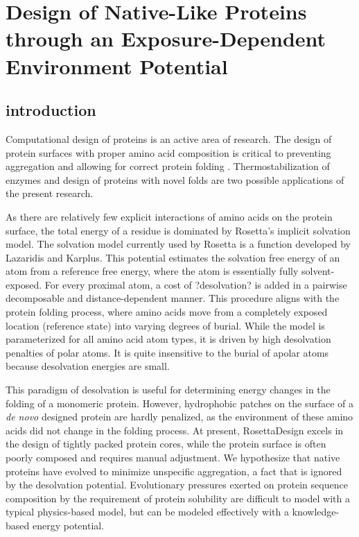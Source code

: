 \chapter{Design of Native-Like Proteins through an Exposure-Dependent Environment Potential}

\section{introduction}
Computational design of proteins is an active area of research.
The design of protein surfaces with proper amino acid composition is critical to preventing aggregation and allowing for correct protein folding \citep{Chandler:2005ds}.
Thermostabilization of enzymes and design of proteins with novel folds are two possible applications of the present research. 

As there are relatively few explicit interactions of amino acids on the protein surface, the total energy of a residue is dominated by Rosetta's implicit solvation model.
The solvation model currently used by Rosetta is a function developed by Lazaridis and Karplus\citep{Lazaridis:1999wi}.
This potential estimates the solvation free energy of an atom from a reference free energy, where the atom is essentially fully solvent-exposed.
For every proximal atom, a cost of ?desolvation? is added in a pairwise decomposable and distance-dependent manner.
This procedure aligns with the protein folding process, where amino acids move from a completely exposed location (reference state) into varying degrees of burial.
While the model is parameterized for all amino acid atom types, it is driven by high desolvation penalties of polar atoms.
It is quite insensitive to the burial of apolar atoms because desolvation energies are small. 

This paradigm of desolvation is useful for determining energy changes in the folding of a monomeric protein.
However, hydrophobic patches on the surface of a {\em de novo} designed protein are hardly penalized, as the environment of these amino acids did not change in the folding process.
At present, RosettaDesign excels in the design of tightly packed protein cores, while the protein surface is often poorly composed and requires manual adjustment\citep{Dantas:2003vt}.
We hypothesize that native proteins have evolved to minimize unspecific aggregation, a fact that is ignored by the desolvation potential.
Evolutionary pressures exerted on protein sequence composition by the requirement of protein solubility are difficult to model with a typical physics-based model, but can be modeled effectively with a knowledge-based energy potential. 

